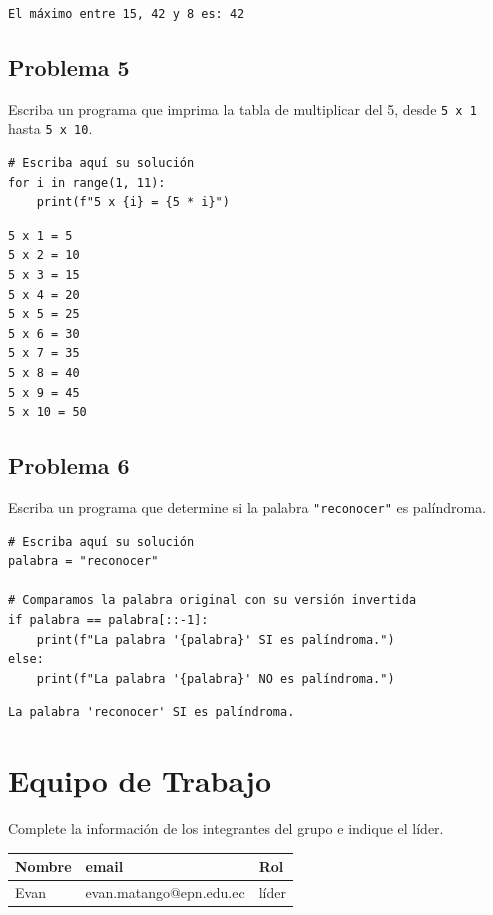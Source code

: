 \documentclass{article}
\begin{document}
\begin{verbatim}
El máximo entre 15, 42 y 8 es: 42
\end{verbatim}

\subsection{Problema 5}
\label{sec:orgd2711f1}
Escriba un programa que imprima la tabla de multiplicar del 5, desde \texttt{5 x 1} hasta \texttt{5 x 10}.

\begin{verbatim}
# Escriba aquí su solución
for i in range(1, 11):
    print(f"5 x {i} = {5 * i}")
\end{verbatim}

\begin{verbatim}
5 x 1 = 5
5 x 2 = 10
5 x 3 = 15
5 x 4 = 20
5 x 5 = 25
5 x 6 = 30
5 x 7 = 35
5 x 8 = 40
5 x 9 = 45
5 x 10 = 50
\end{verbatim}

\subsection{Problema 6}
\label{sec:org85a6535}
Escriba un programa que determine si la palabra \texttt{"reconocer"} es palíndroma.

\begin{verbatim}
# Escriba aquí su solución
palabra = "reconocer"

# Comparamos la palabra original con su versión invertida
if palabra == palabra[::-1]:
    print(f"La palabra '{palabra}' SI es palíndroma.")
else:
    print(f"La palabra '{palabra}' NO es palíndroma.")
\end{verbatim}

\begin{verbatim}
La palabra 'reconocer' SI es palíndroma.
\end{verbatim}



\section{Equipo de Trabajo}
\label{sec:orgb166d2c}
Complete la información de los integrantes del grupo e indique el líder.

\begin{center}
\begin{tabular}{lll}
\hline
Nombre & email & Rol\\[0pt]
\hline
Evan & evan.matango@epn.edu.ec & líder\\[0pt]
\hline
\end{tabular}
\end{center}
\end{document}
